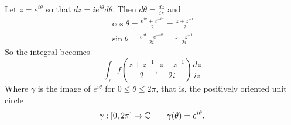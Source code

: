 \documentclass{homework}
\begin{document}
                                                                                                                                                                            \begin{solution}
                                                                                                                                                                            Let $z=e^{i\theta}$ so that $dz = ie^{i\theta} d\theta$. Then $d\theta = \frac{dz}{iz}$ and 
                                                                                                                                                                            \begin{gather*}
                                                                                                                                                                            \cos\theta = \frac{e^{i\theta} + e^{-i\theta}}{2} = \frac{z+z^{-1}}{2}\\
                                                                                                                                                                            \sin\theta = \frac{e^{i\theta} - e^{-i\theta}}{2i} = \frac{z-z^{-1}}{2i}
                                                                                                                                                                            \end{gather*}
                                                                                                                                                                            So the integral becomes
                                                                                                                                                                            \[
                                                                                                                                                                            \int_\gamma f(\frac{z+z^{-1}}{2},\frac{z-z^{-1}}{2i})\frac{dz}{iz}
                                                                                                                                                                            \]
                                                                                                                                                                            Where $\gamma$ is the image of $e^{i\theta}$ for $0\leq \theta \leq 2\pi$, that is, the positively oriented unit circle 
                                                                                                                                                                            \[\gamma:[0, 2\pi] \to \mathbb{C}\qquad \gamma(\theta)= e^{i\theta}.\]


\end{solution}
\end{document}
